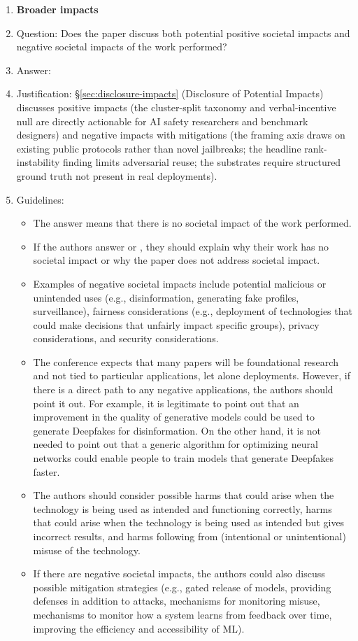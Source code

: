 \documentclass{article}
\begin{document}
\begin{enumerate}
\item {\bf Broader impacts}
    \item[] Question: Does the paper discuss both potential positive societal impacts and negative societal impacts of the work performed?
    \item[] Answer: \answerYes{} %
    \item[] Justification: \S\ref{sec:disclosure-impacts} (Disclosure of Potential Impacts) discusses positive impacts (the cluster-split taxonomy and verbal-incentive null are directly actionable for AI safety researchers and benchmark designers) and negative impacts with mitigations (the framing axis draws on existing public protocols rather than novel jailbreaks; the headline rank-instability finding limits adversarial reuse; the substrates require structured ground truth not present in real deployments).
    \item[] Guidelines:
    \begin{itemize}
        \item The answer \answerNA{} means that there is no societal impact of the work performed.
        \item If the authors answer \answerNA{} or \answerNo, they should explain why their work has no societal impact or why the paper does not address societal impact.
        \item Examples of negative societal impacts include potential malicious or unintended uses (e.g., disinformation, generating fake profiles, surveillance), fairness considerations (e.g., deployment of technologies that could make decisions that unfairly impact specific groups), privacy considerations, and security considerations.
        \item The conference expects that many papers will be foundational research and not tied to particular applications, let alone deployments. However, if there is a direct path to any negative applications, the authors should point it out. For example, it is legitimate to point out that an improvement in the quality of generative models could be used to generate Deepfakes for disinformation. On the other hand, it is not needed to point out that a generic algorithm for optimizing neural networks could enable people to train models that generate Deepfakes faster.
        \item The authors should consider possible harms that could arise when the technology is being used as intended and functioning correctly, harms that could arise when the technology is being used as intended but gives incorrect results, and harms following from (intentional or unintentional) misuse of the technology.
        \item If there are negative societal impacts, the authors could also discuss possible mitigation strategies (e.g., gated release of models, providing defenses in addition to attacks, mechanisms for monitoring misuse, mechanisms to monitor how a system learns from feedback over time, improving the efficiency and accessibility of ML).
    \end{itemize}
    

\end{enumerate}
\end{document}

